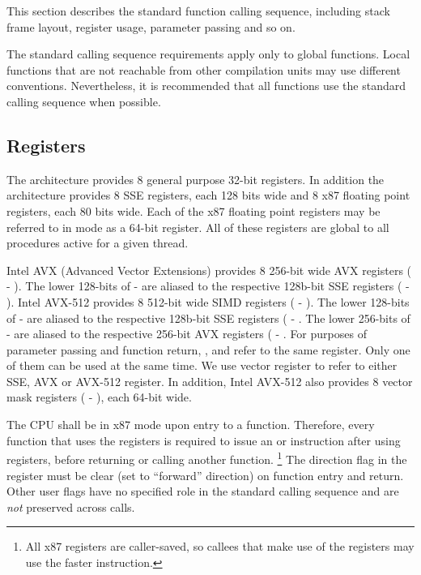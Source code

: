This section describes the standard function calling sequence,
including stack frame layout, register usage, parameter passing and so
on.

The standard calling sequence requirements apply only to global
functions.  Local functions that are not reachable from other
compilation units may use different conventions.  Nevertheless, it is
recommended that all functions use the standard calling sequence when
possible.

\subsection{Registers}
\label{subsec-registers}

The \xARCH architecture provides 8 general purpose 32-bit registers.
In addition the architecture provides 8 SSE registers, each 128 bits
wide and 8 x87 floating point registers, each 80 bits wide.  Each of
the x87 floating point registers may be referred to in \MMX
mode as a 64-bit register.  All of these registers are global to all
procedures active for a given thread.

Intel AVX (Advanced Vector Extensions) provides 8 256-bit wide AVX registers
( - ).  The lower 128-bits of  - 
are aliased to the respective 128b-bit SSE registers ( -
).  Intel AVX-512 provides 8 512-bit wide SIMD registers
( - ).  The lower 128-bits of  - 
are aliased to the respective 128b-bit SSE registers
( - .
The lower 256-bits of  - 
are aliased to the respective 256-bit AVX registers
( - .
For purposes of parameter passing
and function return, ,  and  refer to the
same register. Only one of them can be used at the same time.  We use
vector register to refer to either SSE, AVX or AVX-512 register.  In
addition, Intel AVX-512 also provides 8 vector mask registers (
- ), each 64-bit wide.

The CPU shall be in x87 mode upon entry to a function.  Therefore,
every function that uses the \MMX registers is required to issue an
 or  instruction after using \MMX registers, before
returning or calling another function.  \footnote{All x87 registers
are caller-saved, so callees that make use of the \MMX registers may
use the faster  instruction.}  The direction flag  in the
 register must be clear (set to ``forward'' direction) on function
entry and return.  Other user flags have no specified role in the
standard calling sequence and are {\em not} preserved across calls.

